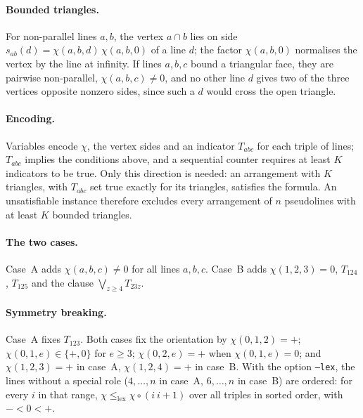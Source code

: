 \documentclass[11pt]{article}
\theoremstyle{definition}
\theoremstyle{remark}
\begin{document}
\paragraph{Bounded triangles.} For non-parallel lines $a, b$, the vertex $a \cap b$ lies on side
$s_{ab}(d) = \chi(a,b,d)\,\chi(a,b,0)$ of a line $d$; the factor $\chi(a,b,0)$ normalises the vertex
by the line at infinity. If lines $a, b, c$ bound a triangular face, they are pairwise non-parallel,
$\chi(a,b,c) \ne 0$, and no other line $d$ gives two of the three vertices opposite nonzero sides,
since such a $d$ would cross the open triangle.

\paragraph{Encoding.} Variables encode $\chi$, the vertex sides and an indicator $T_{abc}$ for each
triple of lines; $T_{abc}$ implies the conditions above, and a sequential counter requires at least
$K$ indicators to be true. Only this direction is needed: an arrangement with $K$ triangles, with
$T_{abc}$ set true exactly for its triangles, satisfies the formula. An unsatisfiable instance
therefore excludes every arrangement of $n$ pseudolines with at least $K$ bounded triangles.

\paragraph{The two cases.} Case~A adds $\chi(a,b,c) \ne 0$ for all lines $a, b, c$. Case~B adds
$\chi(1,2,3) = 0$, $T_{124}$, $T_{125}$ and the clause $\bigvee_{z \ge 4} T_{23z}$.

\paragraph{Symmetry breaking.} Case~A fixes $T_{123}$. Both cases fix the orientation by
$\chi(0,1,2) = +$; $\chi(0,1,e) \in \{+, 0\}$ for $e \ge 3$; $\chi(0,2,e) = +$ when
$\chi(0,1,e) = 0$; and $\chi(1,2,3) = +$ in case~A, $\chi(1,2,4) = +$ in case~B. With the option
\texttt{--lex}, the lines without a special role ($4, \dots, n$ in case~A, $6, \dots, n$ in case~B)
are ordered: for every $i$ in that range, $\chi \le_{\mathrm{lex}} \chi \circ (i\ i{+}1)$ over all
triples in sorted order, with $- < 0 < +$.
\end{document}
